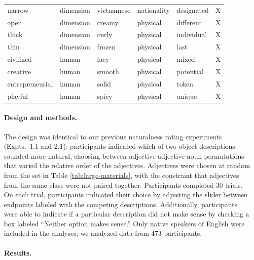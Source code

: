 \documentclass[12pt]{article}
\begin{document}
\begin{table}
{\begin{tabular}{@{\vrule height 10.5pt depth2pt  width0pt}llllll}
narrow	&	dimension	&	vietnamese	&	nationality	&	designated	&	X	\\
open	&	dimension	&	creamy	&	physical	&	different	&	X	\\
thick	&	dimension	&	curly	&	physical	&	individual	&	X	\\
thin	&	dimension	&	frozen	&	physical	&	last	&	X	\\
civilized	&	human	&	lacy	&	physical	&	mixed	&	X	\\
creative	&	human	&	smooth	&	physical	&	potential	&	X	\\
entrepreneurial	&	human	&	solid	&	physical	&	token	&	X	\\
playful	&	human	&	spicy	&	physical	&	unique	&	X	\\	\bottomrule												
		\end{tabular}} 
\end{table}


\paragraph{Design and methods.}

The design was identical to our previous naturalness rating experiments (Expts.~1.1 and 2.1): participants indicated which of two object descriptions sounded more natural, choosing between adjective-adjective-noun permutations that varied the relative order of the adjectives. Adjectives were chosen at random from the set in Table \ref{tab:large-materials}, with the constraint that adjectives from the same class were not paired together.
%
Participants completed 30 trials. On each trial, participants indicated their choice by adjusting the slider between endpoints labeled with the competing descriptions. Additionally, participants were able to indicate if a particular description did not make sense by checking a box labeled ``Neither option makes sense.'' Only native speakers of English 
were included in the analyses; we analyzed data from 473 participants.

\paragraph{Results.}

\end{document}
